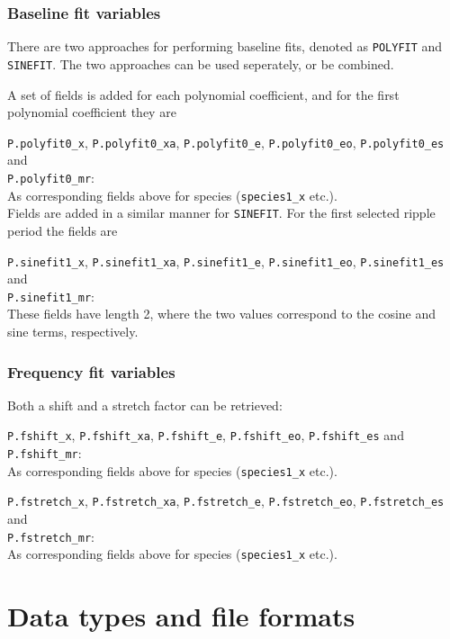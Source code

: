 \documentclass[a4paper,11pt]{article}
\newcommand{\newfield}{\vspace{1ex}\noindent}
\begin{document}
\subsubsection{Baseline fit variables}
%
There are two approaches for performing baseline fits, denoted as
\verb|POLYFIT| and \verb|SINEFIT|. The two approaches can be used 
seperately, or be combined.

A set of fields is added for each polynomial coefficient, and
for the first polynomial coefficient they are

\newfield \verb|P.polyfit0_x|, \verb|P.polyfit0_xa|,
\verb|P.polyfit0_e|,
\verb|P.polyfit0_eo|, \verb|P.polyfit0_es| and\\
\verb|P.polyfit0_mr|:\\
As corresponding fields above for species (\verb|species1_x| etc.).\\

\noindent
Fields are added in a similar manner for \verb|SINEFIT|. For the first 
selected ripple period the fields are

\newfield \verb|P.sinefit1_x|, \verb|P.sinefit1_xa|,
\verb|P.sinefit1_e|,
\verb|P.sinefit1_eo|, \verb|P.sinefit1_es| and\\
\verb|P.sinefit1_mr|:\\
These fields have length 2, where the two values correspond to the cosine and
sine terms, respectively. 


\subsubsection{Frequency fit variables}
%
Both a shift and a stretch factor can be retrieved:

\newfield \verb|P.fshift_x|, \verb|P.fshift_xa|,
\verb|P.fshift_e|,
\verb|P.fshift_eo|, \verb|P.fshift_es| and\\\verb|P.fshift_mr|:\\
As corresponding fields above for species (\verb|species1_x| etc.).

\newfield \verb|P.fstretch_x|, \verb|P.fstretch_xa|,
\verb|P.fstretch_e|,
\verb|P.fstretch_eo|, \verb|P.fstretch_es| and\\\verb|P.fstretch_mr|:\\
As corresponding fields above for species (\verb|species1_x| etc.).



\section{Data types and file formats}
\label{sec:formats}
\end{document}
